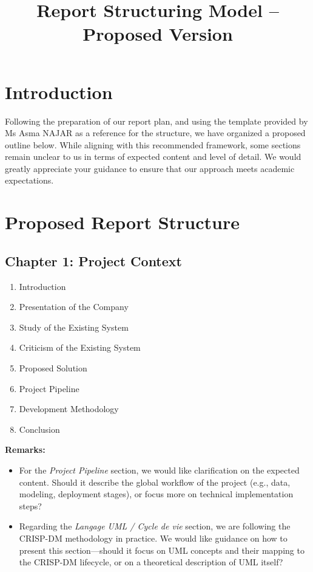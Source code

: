\documentclass[12pt]{article}
\title{Report Structuring Model -- Proposed Version}
\author{}
\date{}
\begin{document}
\maketitle

\section*{Introduction}
Following the preparation of our report plan, and using the template provided by Ms Asma NAJAR as a reference for the structure, we have organized a proposed outline below. While aligning with this recommended framework, some sections remain unclear to us in terms of expected content and level of detail. We would greatly appreciate your guidance to ensure that our approach meets academic expectations.

\section*{Proposed Report Structure}

\subsection*{Chapter 1: Project Context}
\begin{enumerate}[label=\arabic*.]
    \item Introduction
    \item Presentation of the Company
    \item Study of the Existing System
    \item Criticism of the Existing System
    \item Proposed Solution
    \item Project Pipeline
    \item Development Methodology
    \item Conclusion
\end{enumerate}

\textbf{Remarks:}
\begin{itemize}
    \item For the \textit{Project Pipeline} section, we would like clarification on the expected content. Should it describe the global workflow of the project (e.g., data, modeling, deployment stages), or focus more on technical implementation steps?
    \item Regarding the \textit{Langage UML / Cycle de vie} section, we are following the CRISP-DM methodology in practice. We would like guidance on how to present this section—should it focus on UML concepts and their mapping to the CRISP-DM lifecycle, or on a theoretical description of UML itself?
\end{itemize}
\end{document}
